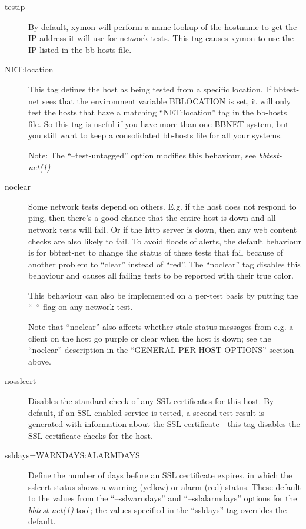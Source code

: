 \begin{description}
\item[testip] By default, xymon will perform a name lookup of the
  hostname to get the IP address it will use for network tests. This
  tag causes xymon to use the IP listed in the bb-hosts file. 


 

\item[NET:location] This tag defines the host as being tested from a
  specific location. If bbtest-net sees that the environment variable
  BBLOCATION is set, it will only test the hosts that have a matching
  ``NET:location'' tag in the bb-hosts file. So this tag is useful if
  you have more than one BBNET system, but you still want to keep a
  consolidated bb-hosts file for all your systems. 


  Note: The ``--test-untagged'' option modifies this behaviour, see \emph{bbtest-net(1)}



 

\item[noclear] Some network tests depend on others. E.g. if the host
  does not respond to ping, then there's a good chance that the entire
  host is down and all network tests will fail. Or if the http server
  is down, then any web content checks are also likely to fail. To
  avoid floods of alerts, the default behaviour is for bbtest-net to
  change the status of these tests that fail because of another
  problem to ``clear'' instead of ``red''. The ``noclear'' tag
  disables this behaviour and causes all failing tests to be reported
  with their true color. 


  This behaviour can also be implemented on a per-test basis by putting the ``~`` flag on any network test. 


  Note that ``noclear'' also affects whether stale status messages
  from e.g. a client on the host go purple or clear when the host is
  down; see the ``noclear'' description in the ``GENERAL PER-HOST
  OPTIONS'' section above. 

\item[nosslcert] Disables the standard check of any SSL certificates
  for this host. By default, if an SSL-enabled service is tested, a
  second test result is generated with information about the SSL
  certificate - this tag disables the SSL certificate checks for the
  host. 


 

\item[ssldays=WARNDAYS:ALARMDAYS] Define the number of days before an
  SSL certificate expires, in which the sslcert status shows a warning
  (yellow) or alarm (red) status. These default to the values from the
  ``--sslwarndays'' and ``--sslalarmdays'' options for the
  \emph{bbtest-net(1)} tool; the values specified in the ``ssldays''
  tag overrides the default. 



\end{description}
